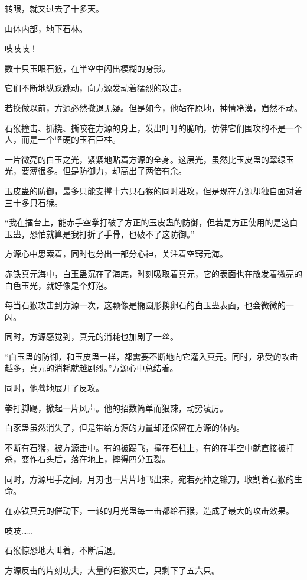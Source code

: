 
\begin{this_body}

转眼，就又过去了十多天。

山体内部，地下石林。

吱吱吱！

数十只玉眼石猴，在半空中闪出模糊的身影。

它们不断地纵跃跳动，向方源发动着猛烈的攻击。

若换做以前，方源必然撤退无疑。但是如今，他站在原地，神情冷漠，岿然不动。

石猴撞击、抓挠、撕咬在方源的身上，发出叮叮的脆响，仿佛它们围攻的不是一个人，而是一个坚硬的玉石巨柱。

一片微亮的白玉之光，紧紧地贴着方源的全身。这层光，虽然比玉皮蛊的翠绿玉光，要薄很多。但是防御力，却高出了两倍有余。

玉皮蛊的防御，最多只能支撑十六只石猴的同时进攻，但是现在方源却独自面对着三十多只石猴。

“我在擂台上，能赤手空拳打破了方正的玉皮蛊的防御，但若是方正使用的是这白玉蛊，恐怕就算是我打折了手骨，也破不了这防御。”

方源心中思索着，同时也分出一部分心神，关注着空窍元海。

赤铁真元海中，白玉蛊沉在了海底，时刻吸取着真元，它的表面也在散发着微亮的白色玉光，就好像是个灯泡。

每当石猴攻击到方源一次，这颗像是椭圆形鹅卵石的白玉蛊表面，也会微微的一闪。

同时，方源感觉到，真元的消耗也加剧了一丝。

“白玉蛊的防御，和玉皮蛊一样，都需要不断地向它灌入真元。同时，承受的攻击越多，真元的消耗就越剧烈。”方源心中总结着。

同时，他蓦地展开了反攻。

拳打脚踢，掀起一片风声。他的招数简单而狠辣，动势凌厉。

白豕蛊虽然消失了，但是带给方源的力量却还保留在方源的体内。

不断有石猴，被方源击中。有的被踢飞，撞在石柱上，有的在半空中就直接被打杀，变作石头后，落在地上，摔得四分五裂。

同时，方源甩手之间，月刃也一片片地飞出来，宛若死神之镰刀，收割着石猴的生命。

在赤铁真元的催动下，一转的月光蛊每一击都给石猴，造成了最大的攻击效果。

吱吱……

石猴惊恐地大叫着，不断后退。

方源反击的片刻功夫，大量的石猴灭亡，只剩下了五六只。


\end{this_body}
